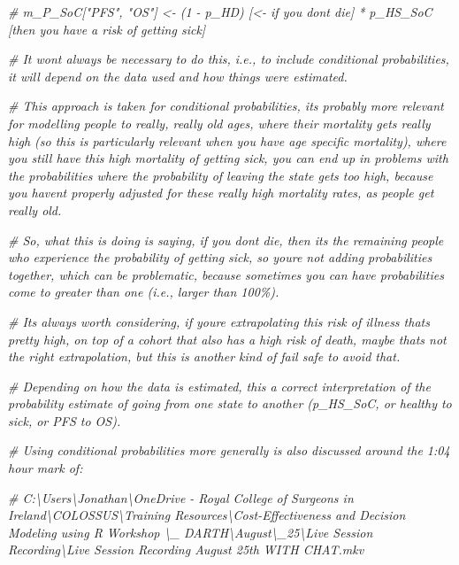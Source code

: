 \documentclass[
]{article}
\newenvironment{Shaded}{\begin{snugshade}}{\end{snugshade}}
\newcommand{\CommentTok}[1]{\textcolor[rgb]{0.56,0.35,0.01}{\textit{#1}}}
\begin{document}
\begin{Shaded}
\begin{Highlighting}[]
\CommentTok{\# m\_P\_SoC["PFS", "OS"]    \textless{}{-} (1 {-} p\_HD) [\textless{}{-} if you don\textquotesingle{}t die] *      p\_HS\_SoC [then you have a risk of getting sick]}

\CommentTok{\# It wont always be necessary to do this, i.e., to include conditional probabilities, it will depend on the data used and how things were estimated.}

\CommentTok{\# This approach is taken for conditional probabilities, it\textquotesingle{}s probably more relevant for modelling people to really, really old ages, where their mortality gets really high (so this is particularly relevant when you have age specific mortality), where you still have this high mortality of getting sick, you can end up in problems with the probabilities where the probability of leaving the state gets too high, because you haven\textquotesingle{}t properly adjusted for these really high mortality rates, as people get really old.}

\CommentTok{\# So, what this is doing is saying, if you don\textquotesingle{}t die, then it\textquotesingle{}s the remaining people who experience the probability of getting sick, so you\textquotesingle{}re not adding probabilities together, which can be problematic, because sometimes you can have probabilities come to greater than one (i.e., larger than 100\%).}

\CommentTok{\# It\textquotesingle{}s always worth considering, if you\textquotesingle{}re extrapolating this risk of illness that\textquotesingle{}s pretty high, on top of a cohort that also has a high risk of death, maybe that\textquotesingle{}s not the right extrapolation, but this is another kind of fail safe to avoid that.}

\CommentTok{\# Depending on how the data is estimated, this a correct interpretation of the probability estimate of going from one state to another (p\_HS\_SoC, or healthy to sick, or PFS to OS). }


\CommentTok{\# Using conditional probabilities more generally is also discussed around the 1:04 hour mark of:}

\CommentTok{\# C:\textbackslash{}Users\textbackslash{}Jonathan\textbackslash{}OneDrive {-} Royal College of Surgeons in Ireland\textbackslash{}COLOSSUS\textbackslash{}Training Resources\textbackslash{}Cost{-}Effectiveness and Decision Modeling using R Workshop \textbackslash{}\_ DARTH\textbackslash{}August\textbackslash{}\_25\textbackslash{}Live Session Recording\textbackslash{}Live Session Recording August 25th WITH CHAT.mkv}
\end{Highlighting}
\end{Shaded}
\end{document}
